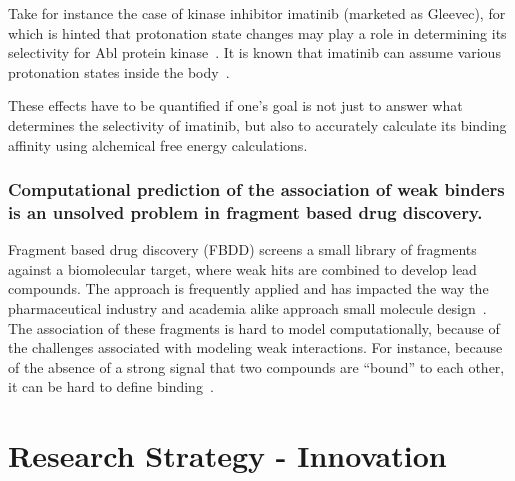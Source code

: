 \documentclass[10pt,final]{article}
\newif\ifinstr
\newcommand{\instr}[1]{\ifdraft{\ifinstr {\color{cyan}\emph{#1}} \fi}{}}
\begin{document}
Take for instance the case of kinase inhibitor imatinib (marketed as Gleevec), for which is hinted that protonation state changes may play a role in determining its selectivity for Abl protein kinase~\cite{Lin2013a}.
It is known that imatinib can assume various protonation states inside the body~\cite{Szakacs2005a}.

These effects have to be quantified if one's goal is not just to answer what determines the selectivity of imatinib, but also to accurately calculate its binding affinity using alchemical free energy calculations.

\subsubsection*{Computational prediction of the association of weak binders is an unsolved problem in fragment based drug discovery.}
Fragment based drug discovery (FBDD) screens a small library of fragments against a biomolecular target, where weak hits are combined to develop lead compounds.
The approach is frequently applied and has impacted the way the pharmaceutical industry and academia alike approach small molecule design~\cite{Hajduk2007a}.
The association of these fragments is hard to model computationally, because of the challenges associated with modeling weak interactions. 
For instance, because of the absence of a strong signal that two compounds are ``bound'' to each other, it can be hard to define binding~\cite{Gilson1997a}. 



\section*{Research Strategy - Innovation}
\instr{Explain how your proposal differs from what others have tried.}
\end{document}
